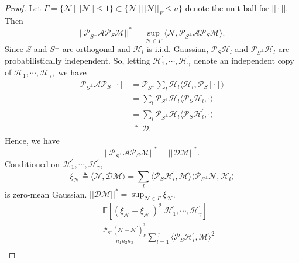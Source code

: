 \documentclass[journal,transmag]{IEEEtran}
\theoremstyle{plain}
\begin{document}
\begin{proof}
Let $\Gamma=\{\mathcal{N}\,|\, ||\mathcal{N}||\le1\} \subset\{\mathcal{N}\,|\,||\mathcal{N}||_F\le a\}$ denote the unit ball for $||\cdot||$. Then
\begin{equation}
||\mathcal{P}_{S^{\bot}}\mathcal{A}\mathcal{P}_S\mathcal{M}||^*=\sup_{\mathcal{N}\in\Gamma}\langle\mathcal{N},\mathcal{P}_{S^{\bot}}\mathcal{A}\mathcal{P}_S\mathcal{M}\rangle.
\end{equation}
Since $S$ and $S^{\bot}$ are orthogonal and $\mathcal{H}_l$ is i.i.d. Gaussian, $\mathcal{P}_S\mathcal{H}_l$ and $\mathcal{P}_{S^{\bot}}\mathcal{H}_l$ are probabilistically independent. So, letting $\mathcal{H}_1^{'},\cdots,\mathcal{H}_{\gamma}^{'}$ denote an independent copy of $\mathcal{H}_1,\cdots,\mathcal{H}_{\gamma},$ we have
\begin{equation}
\begin{split}
\mathcal{P}_{S^{\bot}}\mathcal{A}\mathcal{P}_S[\cdot] &= \mathcal{P}_{S^{\bot}}\sum_l \mathcal{H}_l \langle\mathcal{H}_l,\mathcal{P}_S[\cdot]\rangle \\
&=\sum_l \mathcal{P}_{S^{\bot}}\mathcal{H}_l \langle\mathcal{P}_S\mathcal{H}_l,\cdot\rangle \\
&=\sum_l \mathcal{P}_{S^{\bot}}\mathcal{H}_l \langle\mathcal{P}_S\mathcal{H}_l^{'},\cdot\rangle \\
&\triangleq \mathcal{D},
\end{split}
\end{equation}
Hence, we have
\begin{equation}
||\mathcal{P}_{S^{\bot}}\mathcal{A}\mathcal{P}_S \mathcal{M}||^*=||\mathcal{D}\mathcal{M}||^*.
\end{equation}
Conditioned on $\mathcal{H}_1^{'},\cdots,\mathcal{H}_{\gamma}^{'}$,
\begin{equation}
\xi_{\mathcal{N}}\triangleq\langle\mathcal{N},\mathcal{D}\mathcal{M}\rangle
=\sum_l\langle\mathcal{P}_S \mathcal{H}_l^{'},\mathcal{M}\rangle \langle\mathcal{P}_{S^{\bot}} \mathcal{N}, \mathcal{H}_l\rangle
\end{equation}
is zero-mean Gaussian. $||\mathcal{D}\mathcal{M}||^*=\sup_{\mathcal{N}\in \Gamma}\xi_{\mathcal{N}}$.
\begin{equation}
\begin{split}
&\mathbb{E}[(\xi_{\mathcal{N}}-\xi_{\mathcal{N}^{'}})^2|\mathcal{H}_1^{'},\cdots,\mathcal{H}_{\gamma}^{'}]\\
=&\frac{\mathcal{P}_{S^{\bot}}(\mathcal{N}-\mathcal{N}^{'})^2_F}{n_1 n_2 n_3} \sum^{\gamma}_{l=1}\langle\mathcal{P}_{S}\mathcal{H}_l^{'},\mathcal{M}\rangle^2 \\

\end{split}
\end{equation}
\end{proof}
\end{document}

